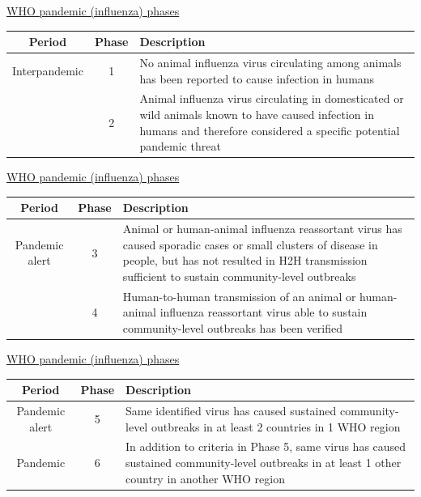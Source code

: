 \documentclass[aspectratio=43]{beamer}
\begin{document}
\begin{frame}{\href{https://www.ncbi.nlm.nih.gov/books/NBK143061/}{WHO pandemic (influenza) phases}}


\begin{tabular}{ccp{6cm}}
Period & Phase & Description \\
\hline
\rowcolor{lgreen} \color{black}Interpandemic & \color{black}1 & \color{black} No animal influenza virus circulating among animals has been reported to cause infection in humans \\
\rowcolor{lgreen} & \color{black}2 & \color{black}Animal influenza virus circulating in domesticated or wild animals known to have caused infection in humans and therefore considered a specific potential pandemic threat
\end{tabular}
\end{frame}

\begin{frame}{\href{https://www.ncbi.nlm.nih.gov/books/NBK143061/}{WHO pandemic (influenza) phases}}
\begin{tabular}{ccp{6cm}}
Period & Phase & Description \\
\hline 
\rowcolor{yellow} \color{black}Pandemic alert & \color{black}3 & \color{black}Animal or human-animal influenza reassortant virus has caused sporadic cases or small clusters of disease in people, but has not resulted in H2H transmission sufficient to sustain community-level outbreaks \\
\rowcolor{yellow} & \color{black}4 & \color{black}Human-to-human transmission of an animal or human-animal influenza reassortant virus able to sustain community-level outbreaks has been verified 
\end{tabular}
\end{frame}

\begin{frame}{\href{https://www.ncbi.nlm.nih.gov/books/NBK143061/}{WHO pandemic (influenza) phases}}
\begin{tabular}{ccp{6cm}}
    Period & Phase & Description \\
    \hline 
\rowcolor{orange} \color{black}Pandemic alert & \color{black} 5 & \color{black} Same identified virus has caused sustained community-level outbreaks in at least 2 countries in 1 WHO region \\
\rowcolor{lred} \color{black}Pandemic & \color{black}6 & \color{black}In addition to criteria in Phase 5, same virus has caused sustained community-level outbreaks in at least 1 other country in another WHO region
\end{tabular}
\end{frame}
\end{document}
